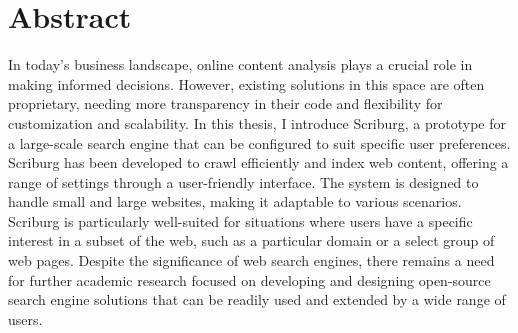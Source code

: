\chapter*{Abstract}
In today's business landscape, online content analysis plays a crucial role in making informed decisions. However, existing solutions in this space are often proprietary, needing more transparency in their code and flexibility for customization and scalability. In this thesis, I introduce Scriburg, a prototype for a large-scale search engine that can be configured to suit specific user preferences. Scriburg has been developed to crawl efficiently and index web content, offering a range of settings through a user-friendly interface. The system is designed to handle small and large websites, making it adaptable to various scenarios. Scriburg is particularly well-suited for situations where users have a specific interest in a subset of the web, such as a particular domain or a select group of web pages. Despite the significance of web search engines, there remains a need for further academic research focused on developing and designing open-source search engine solutions that can be readily used and extended by a wide range of users.
